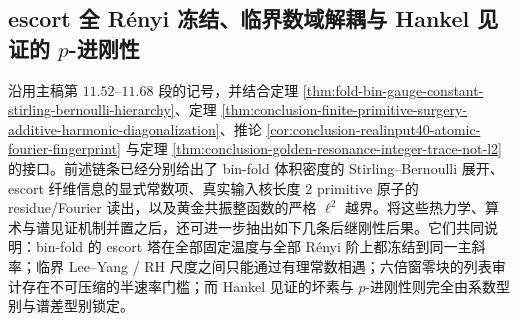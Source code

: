 \subsection{escort 全 Rényi 冻结、临界数域解耦与 Hankel 见证的 \texorpdfstring{$p$}{p}-进刚性}\label{subsec:conclusion-escort-criticalfield-hankel-padic-rigidity}

沿用主稿第 \(11.52\)–\(11.68\) 段的记号，并结合定理 \ref{thm:fold-bin-gauge-constant-stirling-bernoulli-hierarchy}、定理 \ref{thm:conclusion-finite-primitive-surgery-additive-harmonic-diagonalization}、推论 \ref{cor:conclusion-realinput40-atomic-fourier-fingerprint} 与定理 \ref{thm:conclusion-golden-resonance-integer-trace-not-l2} 的接口。前述链条已经分别给出了 bin-fold 体积密度的 Stirling--Bernoulli 展开、escort 纤维信息的显式常数项、真实输入核长度 \(2\) primitive 原子的 residue/Fourier 读出，以及黄金共振整函数的严格 \(\ell^2\) 越界。将这些热力学、算术与谱见证机制并置之后，还可进一步抽出如下几条后继刚性后果。它们共同说明：bin-fold 的 escort 塔在全部固定温度与全部 Rényi 阶上都冻结到同一主斜率；临界 Lee--Yang / RH 尺度之间只能通过有理常数相遇；六倍窗零块的列表审计存在不可压缩的半速率门槛；而 Hankel 见证的坏素与 \(p\)-进刚性则完全由系数型别与谱差型别锁定。

